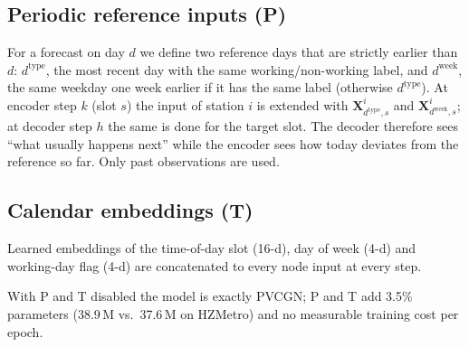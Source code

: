\documentclass[journal]{IEEEtran}
\begin{document}
\subsection{Periodic reference inputs (P)}
For a forecast on day $d$ we define two reference days that are strictly earlier than $d$: $d^{\text{type}}$, the most recent day with the same working/non-working label, and $d^{\text{week}}$, the same weekday one week earlier if it has the same label (otherwise $d^{\text{type}}$). At encoder step $k$ (slot $s$) the input of station $i$ is extended with $\mathbf{X}^{i}_{d^{\text{type}},s}$ and $\mathbf{X}^{i}_{d^{\text{week}},s}$; at decoder step $h$ the same is done for the target slot. The decoder therefore sees ``what usually happens next'' while the encoder sees how today deviates from the reference so far. Only past observations are used.

\subsection{Calendar embeddings (T)}
Learned embeddings of the time-of-day slot (16-d), day of week (4-d) and working-day flag (4-d) are concatenated to every node input at every step.

With P and T disabled the model is exactly PVCGN; P and T add 3.5\% parameters (38.9\,M vs.\ 37.6\,M on HZMetro) and no measurable training cost per epoch.
\end{document}
